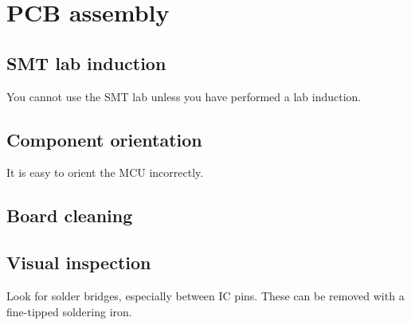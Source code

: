 \chapter{PCB assembly}


\section{SMT lab induction}

You cannot use the SMT lab unless you have performed a lab induction.


\section{Component orientation}

It is easy to orient the MCU incorrectly.




\section{Board cleaning}


\section{Visual inspection}


Look for solder bridges, especially between IC pins.  These can be
removed with a fine-tipped soldering iron.

